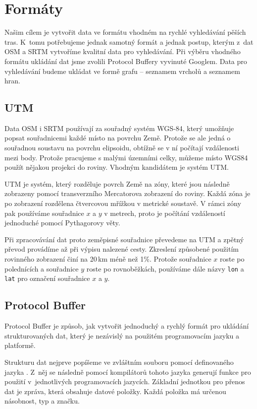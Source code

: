 \chapter{Formáty}
Našim cílem je vytvořit data ve formátu vhodném na rychlé vyhledávání pěších
tras. K~tomu potřebujeme jednak samotný formát a jednak postup, kterým z~dat 
OSM a SRTM vytvoříme kvalitní data pro vyhledávání. Při výběru vhodného formátu
ukládání dat jsme zvolili Protocol Buffery \cite{pbfweb} vyvinuté Googlem. Data
pro vyhledávání budeme ukládat ve formě grafu -- seznamem vrcholů a seznamem hran.

\section{UTM}
Data OSM i SRTM používají za souřadný systém WGS-84, který umožňuje popsat
souřadnicemi každé místo na povrchu Země. Protože se ale jedná o souřadnou
soustavu na povrchu elipsoidu, obtížně se v ní počítají vzdálenosti mezi body.
Protože pracujeme s malými územními celky, můžeme místo WGS84 použít nějakou
projekci do roviny. Vhodným kandidátem je systém UTM. \cite{utmnorma}

UTM je systém, který rozděluje povrch Země na zóny, které jsou následně
zobrazeny pomocí transverzního Mercatorova zobrazení do roviny. Každá zóna je po
zobrazení rozdělena čtvercovou mřížkou v metrické soustavě. V rámci zóny pak
používáme souřadnice $x$ a $y$ v metrech, proto je počítání vzdáleností
jednoduché pomocí Pythagorovy věty.

Při zpracovávání dat proto zeměpisné souřadnice převedeme na UTM a zpětný převod
provádíme až při výpisu nalezené cesty. Zkreslení způsobené použitím rovinného
zobrazení činí na 20\,km méně než 1\%. Protože souřadnice $x$ roste po
polednících a souřadnice $y$ roste po rovnoběžkách, používáme dále názvy
\verb|lon| a \verb|lat| pro označení souřadnice $x$ a $y$.

\section{Protocol Buffer}
Protocol Buffer je způsob, jak vytvořit jednoduchý a rychlý formát pro ukládání
strukturovaných dat, který je nezávislý na použitém programovacím jazyku a
platformě. 

Strukturu dat nejprve popíšeme ve zvláštním souboru pomocí definovaného
jazyka \cite{pbfspec}. Z~něj se následně pomocí kompilátorů tohoto jazyka
generují funkce pro použití v~jednotlivých programovacích jazycích. Základní
jednotkou pro přenos dat je zpráva, která obsahuje datové položky. Každá položka
má určenou násobnost, typ a značku.

